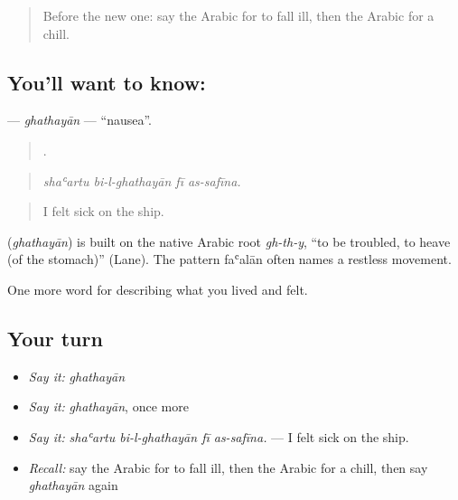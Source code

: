 \label{lesson:AR-C507-ghathayan}



\begin{quote}
Before the new one: say the Arabic for to fall ill, then the Arabic for a chill.
\end{quote}

\subsection*{You'll want to know: }
\textbf{} — \emph{ghathayān} — \textquotedblleft{}nausea\textquotedblright{}.

\begin{quote}
   .
\end{quote}

\begin{quote}
\emph{shaʿartu bi-l-ghathayān fī as-safīna.}
\end{quote}

\begin{quote}
I felt sick on the ship.
\end{quote}

\begin{cousinweb}
\textbf{} (\emph{ghathayān}) is built on the native Arabic root \emph{gh-th-y}, \textquotedblleft{}to be troubled, to heave (of the stomach)\textquotedblright{} (Lane). The pattern faʿalān often names a restless movement.
\end{cousinweb}

\begin{grammarlens}[title={What you've built}]
One more word for describing what you lived and felt.
\end{grammarlens}

\subsection*{Your turn}
\begin{itemize}
\raggedright
  \item \emph{Say it:} \emph{ghathayān}
  \item \emph{Say it:} \emph{ghathayān}, once more
  \item \emph{Say it:} \emph{shaʿartu bi-l-ghathayān fī as-safīna.} — I felt sick on the ship.
  \item \emph{Recall:} say the Arabic for to fall ill, then the Arabic for a chill, then say \emph{ghathayān} again
\end{itemize}

